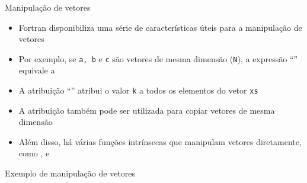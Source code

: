 \begin{frame}[fragile]{Manipulação de vetores}

    \begin{itemize}
        \item Fortran disponibiliza uma série de características úteis para a manipulação de
            vetores

        \item Por exemplo, se \texttt{a, b} e \texttt{c} são vetores de mesma dimensão 
            (\texttt{N}), a expressão ``'' equivale a


        \item A atribuição ``'' atribui o valor \texttt{k} a todos os 
            elementos do vetor \texttt{xs}

        \item A atribuição também pode ser utilizada para copiar vetores de mesma dimensão

        \item Além disso, há várias funções intrínsecas que manipulam vetores diretamente, como
            ,  e 
    \end{itemize}

\end{frame}

\begin{frame}[fragile]{Exemplo de manipulação de vetores}
\end{frame}
